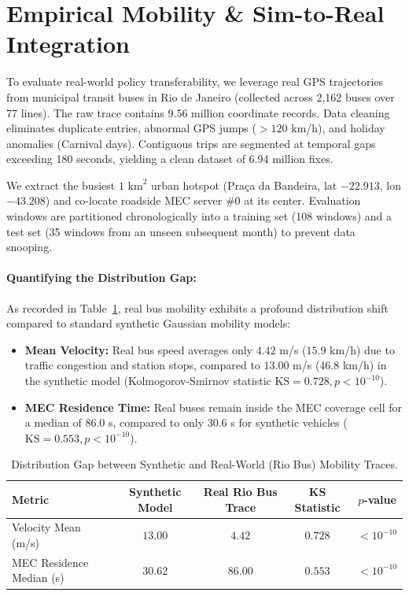 \documentclass[12pt,a4paper]{article}
\begin{document}
\section{Empirical Mobility \& Sim-to-Real Integration}
\label{sec:riobus}
To evaluate real-world policy transferability, we leverage real GPS trajectories from municipal transit buses in Rio de Janeiro (collected across 2,162 buses over 77 lines). The raw trace contains 9.56 million coordinate records. Data cleaning eliminates duplicate entries, abnormal GPS jumps ($>120$ km/h), and holiday anomalies (Carnival days). Contiguous trips are segmented at temporal gaps exceeding 180 seconds, yielding a clean dataset of 6.94 million fixes.

We extract the busiest $1 \text{ km}^2$ urban hotspot (Pra\c{c}a da Bandeira, lat $-22.913$, lon $-43.208$) and co-locate roadside MEC server \#0 at its center. Evaluation windows are partitioned chronologically into a training set (108 windows) and a test set (35 windows from an unseen subsequent month) to prevent data snooping.

\paragraph{Quantifying the Distribution Gap:}
As recorded in Table~\ref{tab:distribution_gap}, real bus mobility exhibits a profound distribution shift compared to standard synthetic Gaussian mobility models:
\begin{itemize}
    \item \textbf{Mean Velocity:} Real bus speed averages only $4.42$ m/s ($15.9$ km/h) due to traffic congestion and station stops, compared to $13.00$ m/s ($46.8$ km/h) in the synthetic model (Kolmogorov-Smirnov statistic $\mathrm{KS} = 0.728, p < 10^{-10}$).
    \item \textbf{MEC Residence Time:} Real buses remain inside the MEC coverage cell for a median of $86.0$ s, compared to only $30.6$ s for synthetic vehicles ($\mathrm{KS} = 0.553, p < 10^{-10}$).
\end{itemize}

\begin{table}[htbp]
\centering
\caption{Distribution Gap between Synthetic and Real-World (Rio Bus) Mobility Traces.}
\label{tab:distribution_gap}
\begin{tabular}{lcccc}
\toprule
\textbf{Metric} & \textbf{Synthetic Model} & \textbf{Real Rio Bus Trace} & \textbf{KS Statistic} & \textbf{$p$-value} \\
\midrule
Velocity Mean (m/s) & $13.00$ & $4.42$ & $0.728$ & $< 10^{-10}$ \\
MEC Residence Median (s) & $30.62$ & $86.00$ & $0.553$ & $< 10^{-10}$ \\
\bottomrule
\end{tabular}
\end{table}
\end{document}
